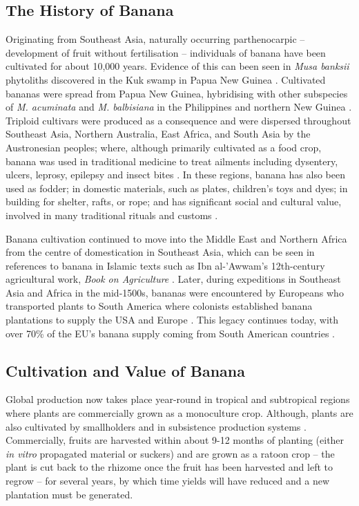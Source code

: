 \subsection{The History of Banana}

Originating from Southeast Asia, naturally occurring parthenocarpic – development of fruit without fertilisation – individuals of banana have been cultivated for about 10,000 years. Evidence of this can been seen in \textit{Musa banksii} phytoliths discovered in the Kuk swamp in Papua New Guinea \parencite{Denham2011}.  Cultivated bananas were spread from Papua New Guinea, hybridising with other subspecies of \textit{M. acuminata} and \textit{M. balbisiana} in the Philippines and northern New Guinea \parencite{Perrier2009}. Triploid cultivars were produced as a consequence and were dispersed throughout Southeast Asia, Northern Australia, East Africa, and South Asia by the Austronesian peoples; where, although primarily cultivated as a food crop, banana was used in traditional medicine to treat ailments including dysentery, ulcers, leprosy, epilepsy and insect bites \parencite{Kumar2012}. In these regions, banana has also been used as fodder; in domestic materials, such as plates, children’s toys and dyes; in building for shelter, rafts, or rope; and has significant social and cultural value, involved in many traditional rituals and customs \parencite{Hapsari2017} .  

Banana cultivation continued to move into the Middle East and Northern Africa from the centre of domestication in Southeast Asia, which can be seen in references to banana in Islamic texts such as Ibn al-'Awwam's 12th-century agricultural work, \textit{Book on Agriculture} \parencite{Clement1866}. Later, during expeditions in Southeast Asia and Africa in the mid-1500s, bananas were encountered by Europeans who transported plants to South America where colonists established banana plantations to supply the USA and Europe \parencite{Guzman-Rivas1960, Salas-Pascual2022}. This legacy continues today, with over 70\% of the EU’s banana supply coming from South American countries \parencite{EuropeanUnion2022}.  

\subsection{Cultivation and Value of Banana}

Global production now takes place year-round in tropical and subtropical regions where plants are commercially grown as a monoculture crop. Although, plants are also cultivated by smallholders and in subsistence production systems \parencite{Viljoen2020}. Commercially, fruits are harvested within about 9-12 months of planting (either\textit{ in vitro} propagated material or suckers) and are grown as a ratoon crop – the plant is cut back to the rhizome once the fruit has been harvested and left to regrow – for several years, by which time yields will have reduced and a new plantation must be generated. 

